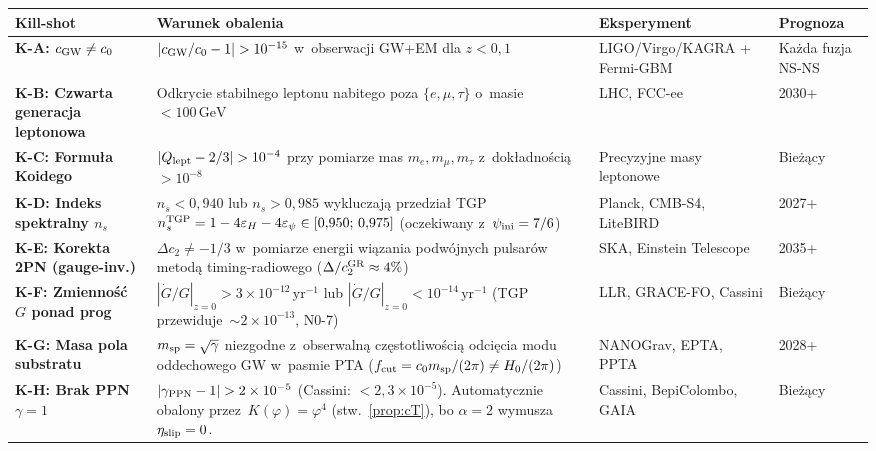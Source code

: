 \begin{center}\footnotesize
\begin{longtable}{@{}>{\bfseries}p{2.6cm}p{5.8cm}p{2.4cm}p{2.0cm}@{}}
\toprule
\textbf{Kill-shot} & \textbf{Warunek obalenia} & \textbf{Eksperyment} & \textbf{Prognoza} \\
\midrule

K-A: $c_{\rm GW} \neq c_0$ &
  $|c_{\rm GW}/c_0 - 1| > 10^{-15}$ w~obserwacji GW+EM
  dla $z < 0{,}1$ &
  LIGO/Virgo/KAGRA + Fermi-GBM &
  Ka\.zda fuzja NS-NS \\[5pt]

K-B: Czwarta generacja leptonowa &
  Odkrycie stabilnego leptonu nabitego poza $\{e,\mu,\tau\}$
  o~masie $< 100\,\mathrm{GeV}$ &
  LHC, FCC-ee &
  2030+ \\[5pt]

K-C: Formu\l{}a Koidego &
  $|Q_{\rm lept} - 2/3| > 10^{-4}$
  przy pomiarze mas $m_e,m_\mu,m_\tau$ z~dok\l{}adno\'sci\k{a} $> 10^{-8}$ &
  Precyzyjne masy leptonowe &
  Bie\.z\k{a}cy \\[5pt]

K-D: Indeks spektralny $n_s$ &
  $n_s < 0{,}940$ lub $n_s > 0{,}985$ wykluczaj\k{a} przedzia\l{}
  TGP $n_s^{\rm TGP} = 1 - 4\varepsilon_H - 4\varepsilon_\psi
  \in [0{,}950;\,0{,}975]$
  (oczekiwany z~$\psi_{\rm ini} = 7/6$) &
  Planck, CMB-S4, LiteBIRD &
  2027+ \\[5pt]

K-E: Korekta 2PN (gauge-inv.) &
  $\Delta c_2 \neq -1/3$ w~pomiarze energii
  wi\k{a}zania podw\'ojnych pulsar\'ow metod\k{a}
  timing-radiowego ($\Delta/c_2^{\rm GR} \approx 4\%$) &
  SKA, Einstein Telescope &
  2035+ \\[5pt]

K-F: Zmienno\'s\'c $G$ ponad prog &
  $|\dot G/G|_{z=0} > 3 \times 10^{-12}\,\mathrm{yr}^{-1}$
  lub $|\dot G/G|_{z=0} < 10^{-14}\,\mathrm{yr}^{-1}$
  (TGP przewiduje~$\sim 2\times 10^{-13}$, N0-7) &
  LLR, GRACE-FO, Cassini &
  Bie\.z\k{a}cy \\[5pt]

K-G: Masa pola substratu &
  $m_{\rm sp} = \sqrt{\gamma}$ niezgodne z~obserwaln\k{a}
  cz\k{e}stotliwo\'sci\k{a} odci\k{e}cia modu oddechowego GW
  w~pasmie PTA ($f_{\rm cut} = c_0 m_{\rm sp}/(2\pi) \neq H_0/(2\pi)$) &
  NANOGrav, EPTA, PPTA &
  2028+ \\[5pt]

K-H: Brak PPN $\gamma = 1$ &
  $|\gamma_{\rm PPN} - 1| > 2 \times 10^{-5}$ (Cassini: $< 2{,}3\times 10^{-5}$).
  Automatycznie obalony przez~$K(\varphi) = \varphi^4$
  (stw.~\ref{prop:cT}), bo $\alpha = 2$ wymusza $\eta_{\rm slip} = 0$. &
  Cassini, BepiColombo, GAIA &
  Bie\.z\k{a}cy \\[5pt]


\end{longtable}
\end{center}

